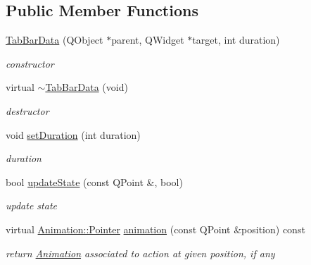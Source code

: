 \subsection*{Public Member Functions}
\begin{DoxyCompactItemize}
\item 
\mbox{\label{class_tab_bar_data_a41713d0bcff3e39c05d1a9787b24115e}} 
\hyperlink{class_tab_bar_data_a41713d0bcff3e39c05d1a9787b24115e}{Tab\+Bar\+Data} (Q\+Object $\ast$parent, Q\+Widget $\ast$target, int duration)
\begin{DoxyCompactList}\small\item\em constructor \end{DoxyCompactList}\item 
\mbox{\label{class_tab_bar_data_afc895f65ffbfef74f3dd0135acf4709a}} 
virtual \hyperlink{class_tab_bar_data_afc895f65ffbfef74f3dd0135acf4709a}{$\sim$\+Tab\+Bar\+Data} (void)
\begin{DoxyCompactList}\small\item\em destructor \end{DoxyCompactList}\item 
\mbox{\label{class_tab_bar_data_a1993529119cec50fa44aafc90d1b5304}} 
void \hyperlink{class_tab_bar_data_a1993529119cec50fa44aafc90d1b5304}{set\+Duration} (int duration)
\begin{DoxyCompactList}\small\item\em duration \end{DoxyCompactList}\item 
\mbox{\label{class_tab_bar_data_a5f5b83cb69c2d091b8948898675569ce}} 
bool \hyperlink{class_tab_bar_data_a5f5b83cb69c2d091b8948898675569ce}{update\+State} (const Q\+Point \&, bool)
\begin{DoxyCompactList}\small\item\em update state \end{DoxyCompactList}\item 
\mbox{\label{class_tab_bar_data_a4535b230c42876389270d4b35caf0493}} 
virtual \hyperlink{class_animation_ac48a8d074abd43dc3f6485353ba24e30}{Animation\+::\+Pointer} \hyperlink{class_tab_bar_data_a4535b230c42876389270d4b35caf0493}{animation} (const Q\+Point \&position) const
\begin{DoxyCompactList}\small\item\em return \hyperlink{class_animation}{Animation} associated to action at given position, if any \end{DoxyCompactList}\item 

\end{DoxyCompactItemize}
